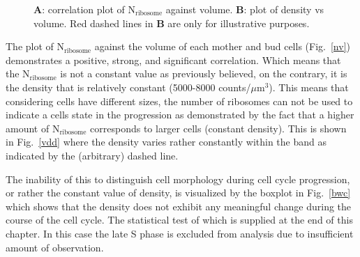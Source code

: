 \begin{figure}[!h]
\centering
{}\hfill
{}
\caption{\textbf{A}: correlation plot of N$_{\text{ribosome}}$ against volume. 
\textbf{B}: plot of density vs volume. 
Red dashed lines in \textbf{B} are only for illustrative purposes. }
\label{fig:corplot}
\end{figure}

The plot of N$_{\text{ribosome}}$ against the volume of each mother and bud cells (Fig.~\ref{nv}) demonstrates a positive, strong, and significant correlation. 
Which means that the N$_{\text{ribosome}}$ is not a constant value as previously believed, on the contrary, it is the density that is relatively constant (5000-8000 counts/$\mu$m$^3$).
This means that considering cells have different sizes, the number of ribosomes can not be used to indicate a cells state in the progression as demonstrated by the fact that a higher amount of N$_{\text{ribosome}}$ corresponds to larger cells (constant density). 
This is shown in Fig.~\ref{vdd} where the density varies rather constantly within the band as indicated by the (arbitrary) dashed line.

The inability of this to distinguish cell morphology during cell cycle progression, or rather the constant value of density, is visualized by the boxplot in Fig.~\ref{bwc} which shows that the density does not exhibit any meaningful change during the course of the cell cycle. 
The statistical test of which is supplied at the end of this chapter. In this case the late S phase is excluded from analysis due to insufficient amount of observation. 

